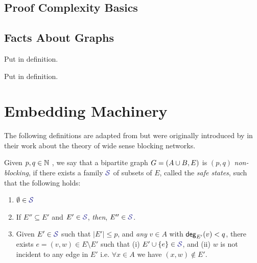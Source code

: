 \documentclass[11pt]{article}
\newcommand{\EnDeeLambda}{(n, d, \lambda)}
\begin{document}
\subsection{Proof Complexity Basics}

\begin{definition}\label{def:poly-calc-refutations}
	
\end{definition}

\subsection{Facts About Graphs}
\begin{definition}[$\EnDeeLambda$-Expander graphs]\label{def:expander-graphs}
Put in definition.    
\end{definition}

\begin{definition}\label{def:top-minor}
Put in definition.    
\end{definition}


\begin{lemma}
	
\end{lemma}


\section{Embedding Machinery}

The following definitions are adapted from \citep{nenadov2023routing} but were originally introduced by \citet{feldman1988wide} in their work about the theory of wide sense blocking networks.

\begin{definition}
Given $p,q \in \mathbb{N}$ , we say that a bipartite graph $G = (A \cup B, E)$ is $(p, q)$ \emph{non-blocking}, if there exists a family $\Family{S}$ of subsets of $E$, called the \emph{safe states}, such that the following holds:

\begin{enumerate}
	\item $\emptyset \in \Family{S}$
	\item If $E'' \subseteq E'$ and $E' \in \Family{S}$, \emph{then}, $E'' \in \Family{S}$.
	\item Given $E' \in \Family{S}$ such that $|E'| \leq p$, and \emph{any} $v \in A$ with $\mathsf{deg}_{E'}(v) < q$, there exists $e = (v, w) \in E \setminus E'$  such that (i) $E' \cup \Set{e} \in \SafeStates $, and (ii) $w$ is not incident to any edge in $E'$ i.e. $\forall x \in A$ we have $(x,w) \notin E'$. 
\end{enumerate}

\end{definition}
\end{document}
